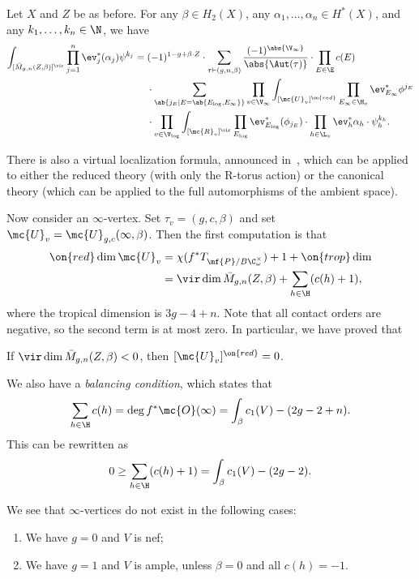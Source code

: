 \begin{thm}
    Let \(X\) and \(Z\) be as before. For any \(\beta \in H_2(X)\), any \(\alpha_1, \ldots, \alpha_n \in H^*(X)\), and any \(k_1, \ldots, k_n \in \N\), we have
    \begin{align*}
        \int_{[\bar{M}_{g,n}(Z,\beta)]^{\vir}} \prod_{j=1}^n \ev_j^* (\alpha_j) \psi^{k_j}={}& (-1)^{1-g+\beta \cdot Z} \cdot \sum_{\tau \vdash (g,n,\beta)} \frac{(-1)^{\abs{\V_{\infty}}}}{\abs{\Aut(\tau)}} \cdot \prod_{E \in \E} c(E) \\
        & \cdot \sum_{\ab\{j_E \mid E = \ab\{E_{\log}, E_{\infty}\}\}}  \prod_{v \in \V_{\infty}} \int_{[\mc{U}_v]^{\on{red}}} \prod_{E_{\infty} \in \H_v} \ev_{E_{\infty}}^* \phi^{j_E}  \\
        &  \cdot \prod_{v \in \V_{\log}} \int_{[\mc{R}_v]^{\vir}} \prod_{E_{\log}} \ev_{E_{\log}}^* (\phi_{j_E}) \cdot \prod_{h \in \L_v} \ev_h^* \alpha_h \cdot \psi_h^{k_h} .
    \end{align*}
\end{thm}

\begin{rmk}
    There is also a virtual localization formula, announced in~\cite{CJRlocalization}, which can be applied to either the reduced theory (with only the R-torus action) or the canonical theory (which can be applied to the full automorphisms of the ambient space).
\end{rmk}

Now consider an \(\infty\)-vertex. Set \(\tau_v = (g, c, \beta)\) and set \(\mc{U}_v = \mc{U}_{g,c}(\infty, \beta)\). Then the first computation is that
\begin{align*}
    \on{red}\dim \mc{U}_v &= \chi(f^* T_{\mf{P}/B \C^{\times}_{\omega}}) + 1 + \on{trop}\dim  \\
    &= \vir\dim \bar{M}_{g,n}(Z, \beta) + \sum_{h \in \H } (c(h) + 1),
\end{align*}
where the tropical dimension is \(3g-4+n\). Note that all contact orders are negative, so the second term is at most zero. In particular, we have proved that
\begin{cor}
    If \(\vir\dim \bar{M}_{g,n}(Z,\beta) < 0\), then \([\mc{U}_v]^{\on{red}} = 0\).
\end{cor}
We also have a \textit{balancing condition}, which states that 
\begin{equation}\label{eqn:balancing condition}
    \sum_{h \in \H} c(h) = \deg f^* \mc{O}(\infty) = \int_{\beta} c_1(V) - (2g-2+n).
\end{equation}
This can be rewritten as
\[ 0 \geq \sum_{h \in \H} (c(h)+1) = \int_{\beta} c_1(V) - (2g-2). \]
\begin{prop}
    We see that \(\infty\)-vertices do not exist in the following cases:
    \begin{enumerate}
        \item We have \(g = 0\) and \(V\) is nef;
        \item We have \(g=1\) and \(V\) is ample, unless \(\beta = 0\) and all \(c(h) = -1\).
    \end{enumerate}
\end{prop}

